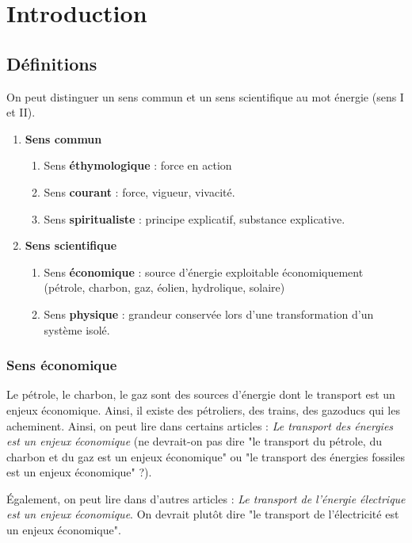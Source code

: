 \chapter{Introduction}
\section{Définitions}
On peut distinguer un sens commun et un sens scientifique au mot énergie (sens I et II).
\begin{enumerate}[label=\Roman*{\bf .}]
\item {\bf Sens commun}
  \begin{enumerate}[label=\arabic*{\bf .}]
  \item Sens {\bf éthymologique} : force en action
  \item Sens {\bf courant} : force, vigueur, vivacité.
  \item Sens {\bf spiritualiste} : principe explicatif, substance explicative.
  \end{enumerate}
\item {\bf Sens scientifique}
  \begin{enumerate}[label=\arabic*{\bf .}]
  \item Sens {\bf économique} : source d'énergie exploitable économiquement (pétrole, charbon, gaz, éolien, hydrolique, solaire)
  \item Sens {\bf physique} : grandeur conservée lors d'une transformation d'un système isolé.
  \end{enumerate}
\end{enumerate}

\subsection{Sens économique}
Le pétrole, le charbon, le gaz sont des sources d'énergie dont le transport est un enjeux économique. Ainsi, il existe des pétroliers, des trains, des gazoducs qui les acheminent. Ainsi, on peut lire dans certains articles : {\it Le transport des énergies est un enjeux économique} (ne devrait-on pas dire "le transport du pétrole, du charbon et du gaz est un enjeux économique" ou "le transport des énergies fossiles est un enjeux économique" ?).

Également, on peut lire dans d'autres articles : {\it Le transport de l'énergie électrique est un enjeux économique}. On devrait plutôt dire "le transport de l'électricité est un enjeux économique".

